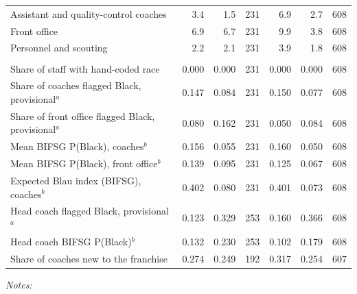 \begin{table}[!h]
\begin{threeparttable}
\begin{tabular}[t]{lrrrrrr}
\hspace{1em}Assistant and quality-control coaches & 3.4 & 1.5 & 231 & 6.9 & 2.7 & 608\\
\hspace{1em}Front office & 6.9 & 6.7 & 231 & 9.9 & 3.8 & 608\\
\hspace{1em}Personnel and scouting & 2.2 & 2.1 & 231 & 3.9 & 1.8 & 608\\
\addlinespace[0.3em]
\multicolumn{7}{l}{\textbf{Staff composition}}\\
\hspace{1em}Share of staff with hand-coded race & 0.000 & 0.000 & 231 & 0.000 & 0.000 & 608\\
\hspace{1em}Share of coaches flagged Black, provisional$^a$ & 0.147 & 0.084 & 231 & 0.150 & 0.077 & 608\\
\hspace{1em}Share of front office flagged Black, provisional$^a$ & 0.080 & 0.162 & 231 & 0.050 & 0.084 & 608\\
\hspace{1em}Mean BIFSG P(Black), coaches$^b$ & 0.156 & 0.055 & 231 & 0.160 & 0.050 & 608\\
\hspace{1em}Mean BIFSG P(Black), front office$^b$ & 0.139 & 0.095 & 231 & 0.125 & 0.067 & 608\\
\hspace{1em}Expected Blau index (BIFSG), coaches$^b$ & 0.402 & 0.080 & 231 & 0.401 & 0.073 & 608\\
\hspace{1em}Head coach flagged Black, provisional$^a$ & 0.123 & 0.329 & 253 & 0.160 & 0.366 & 608\\
\hspace{1em}Head coach BIFSG P(Black)$^b$ & 0.132 & 0.230 & 253 & 0.102 & 0.179 & 608\\
\hspace{1em}Share of coaches new to the franchise & 0.274 & 0.249 & 192 & 0.317 & 0.254 & 607\\
\bottomrule
\end{tabular}
\begin{tablenotes}[para]
\item \textit{Notes:} 

\end{tablenotes}
\end{threeparttable}
\end{table}
